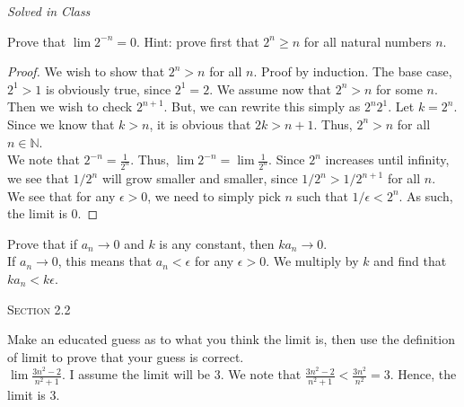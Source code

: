 \documentclass[12pt]{article}
\newcommand{\N}{\mathbb{N}}
\newenvironment{exercise}[2][Exercise]{\begin{trivlist}
\item[\hskip \labelsep {\bfseries #1}\hskip \labelsep {\bfseries #2.}]}{\end{trivlist}}
\begin{document}
\begin{exercise}{2.1.9}
\emph{Solved in Class}
\end{exercise}


\begin{exercise}{2.1.10}
Prove that $\lim 2^{-n} = 0$. Hint: prove first that $2^n \geq n$ for all natural numbers $n$.\\

	\begin{proof} 
	We wish to show that $2^n > n$ for all $n$. Proof by induction. The base case, $2^1 > 1$ is obviously true, since $2^1 = 2$. We assume now that $2^n > n$ for some $n$. Then we wish to check $2^{n+1}$. But, we can rewrite this simply as $2^n 2^1$. Let $k= 2^n$. Since we know that $k > n$, it is obvious that $2 k > n+1$. Thus, $2^n > n$ for all $n \in \N$. \\
	We note that $2^{-n} = \frac{1}{2^n}$. Thus, $\lim 2^{-n}  = \lim \frac{1}{2^n}$. Since $2^n$ increases until infinity, we see that $1/2^{n}$ will grow smaller and smaller, since $1/2^{n} > 1/2^{n+1}$ for all $n$.\\
	We see that for any $\epsilon > 0$, we need to simply pick $n$ such that $1/\epsilon < 2^n$.  As such, the limit is 0.
	\end{proof}
\end{exercise}



\begin{exercise}{2.1.11}
Prove that if $a_n \to 0$ and $k$ is any constant, then $k a_n \to 0$. \\

If $a_n \to 0$, this means that $a_n < \epsilon$ for any $\epsilon > 0$. We multiply by $k$ and find that $k a_n < k \epsilon$.
\end{exercise}



\begin{center}
\textsc{\Large Section 2.2}
\end{center}


\begin{exercise}{2.2.1}
Make an educated guess as to what you think the limit is, then use the definition of limit to prove that your guess is correct.\\

$\lim \frac{3n^2 -2}{n^2 +1}$. I assume the limit will be $3$. We note that $\frac{3n^2 - 2}{n^2+1} <  \frac{3n^2}{n^2} = 3$. Hence, the limit is 3.
\end{exercise}
\end{document}
